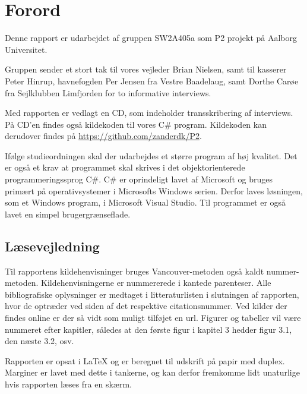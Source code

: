 \chapter*{Forord}
Denne rapport er udarbejdet af gruppen SW2A405a som P2 projekt på Aalborg Universitet.

Gruppen sender et stort tak til vores vejleder Brian Nielsen, samt til kasserer Peter Hinrup, havnefogden Per Jensen fra Vestre Baadelaug, samt Dorthe Carøe fra Sejlklubben Limfjorden for to informative interviews.

Med rapporten er vedlagt en CD, som indeholder transskribering af interviews. På CD'en findes også kildekoden til vores C\# program. Kildekoden kan derudover findes på \url{https://github.com/zanderdk/P2}.

Ifølge studieordningen skal der udarbejdes et større program af høj kvalitet. Det er også et krav at programmet skal skrives i det objektorienterede programmeringssprog C\#. C\# er oprindeligt lavet af Microsoft og bruges primært på operativsystemer i Microsofts Windows serien. Derfor laves løsningen, som et Windows program, i Microsoft Visual Studio. Til programmet er også lavet en simpel brugergrænseflade.

\section*{Læsevejledning}
Til rapportens kildehenvisninger bruges Vancouver-metoden også kaldt nummer-metoden. Kildehenvisningerne er nummererede i kantede parenteser. Alle bibliografiske oplysninger er medtaget i litteraturlisten i slutningen af rapporten, hvor de optræder ved siden af det respektive citationsnummer. Ved kilder der findes online er der så vidt som muligt tilføjet en url. Figurer og tabeller vil være nummeret efter kapitler, således at den første figur i kapitel 3 hedder figur 3.1, den næste 3.2, osv.	

Rapporten er opsat i \LaTeX{} og er beregnet til udskrift på papir med duplex. Marginer er lavet med dette i tankerne, og kan derfor fremkomme lidt unaturlige hvis rapporten læses fra en skærm.
